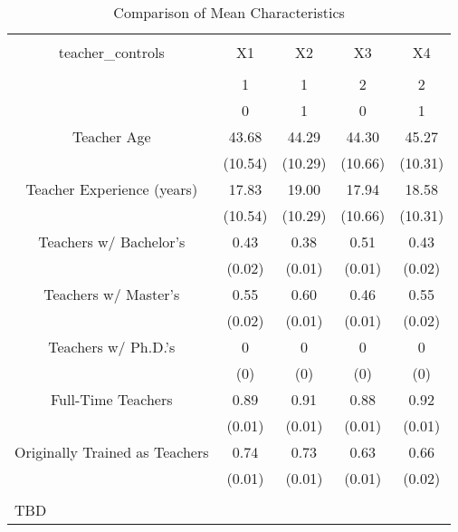 
\begin{table}[!htbp] \centering 
  \caption{Comparison of Mean Characteristics} 
  \label{Tab1} 
\scriptsize 
\begin{tabular}{@{\extracolsep{5pt}} ccccc} 
\\[-1.8ex]\hline 
\hline \\[-1.8ex] 
teacher\_controls & X1 & X2 & X3 & X4 \\ 
\hline \\[-1.8ex] 
 & 1 & 1 & 2 & 2 \\ 
 & 0 & 1 & 0 & 1 \\ 
Teacher Age & 43.68 & 44.29 & 44.30 & 45.27 \\ 
 & (10.54) & (10.29) & (10.66) & (10.31) \\ 
Teacher Experience (years) & 17.83 & 19.00 & 17.94 & 18.58 \\ 
 & (10.54) & (10.29) & (10.66) & (10.31) \\ 
Teachers w/ Bachelor's & 0.43 & 0.38 & 0.51 & 0.43 \\ 
 & (0.02) & (0.01) & (0.01) & (0.02) \\ 
Teachers w/ Master's & 0.55 & 0.60 & 0.46 & 0.55 \\ 
 & (0.02) & (0.01) & (0.01) & (0.02) \\ 
Teachers w/ Ph.D.'s & 0 & 0 & 0 & 0 \\ 
 & (0) & (0) & (0) & (0) \\ 
Full-Time Teachers & 0.89 & 0.91 & 0.88 & 0.92 \\ 
 & (0.01) & (0.01) & (0.01) & (0.01) \\ 
Originally Trained as Teachers & 0.74 & 0.73 & 0.63 & 0.66 \\ 
 & (0.01) & (0.01) & (0.01) & (0.02) \\ 
\hline \\[-1.8ex] 
\multicolumn{5}{l}{TBD} \\ 
\end{tabular} 
\end{table} 
